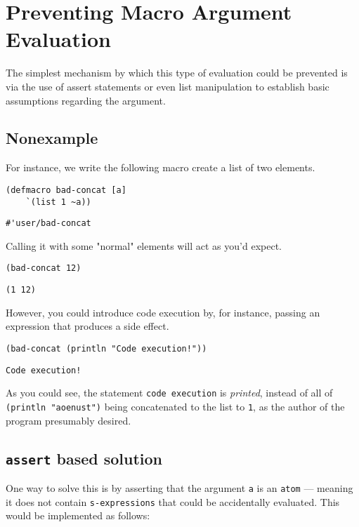 \documentclass[letterpaper]{article}
\begin{document}
\section{Preventing Macro Argument Evaluation}
\label{sec:org6d9ded0}
The simplest mechanism by which this type of evaluation could be prevented is via the use of assert statements or even list manipulation to establish basic assumptions regarding the argument.

\subsection{Nonexample}
\label{sec:org9533b19}
For instance, we write the following macro create a list of two elements.

\begin{verbatim}
(defmacro bad-concat [a]
    `(list 1 ~a))
\end{verbatim}

\begin{verbatim}
#'user/bad-concat
\end{verbatim}


Calling it with some "normal" elements will act as you'd expect.

\begin{verbatim}
(bad-concat 12)
\end{verbatim}

\begin{verbatim}
(1 12)
\end{verbatim}


However, you could introduce code execution by, for instance, passing an expression that produces a side effect.

\begin{verbatim}
(bad-concat (println "Code execution!"))
\end{verbatim}

\begin{verbatim}
Code execution!
\end{verbatim}


As you could see, the statement \texttt{code execution} is \emph{printed}, instead of all of \texttt{(println "aoenust")} being concatenated to the list to \texttt{1}, as the author of the program presumably desired.

\subsection{\texttt{assert} based solution}
\label{sec:orgcd31098}
One way to solve this is by asserting that the argument \texttt{a} is an \texttt{atom} --- meaning it does not contain \texttt{s-expressions} that could be accidentally evaluated. This would be implemented as follows:
\end{document}
